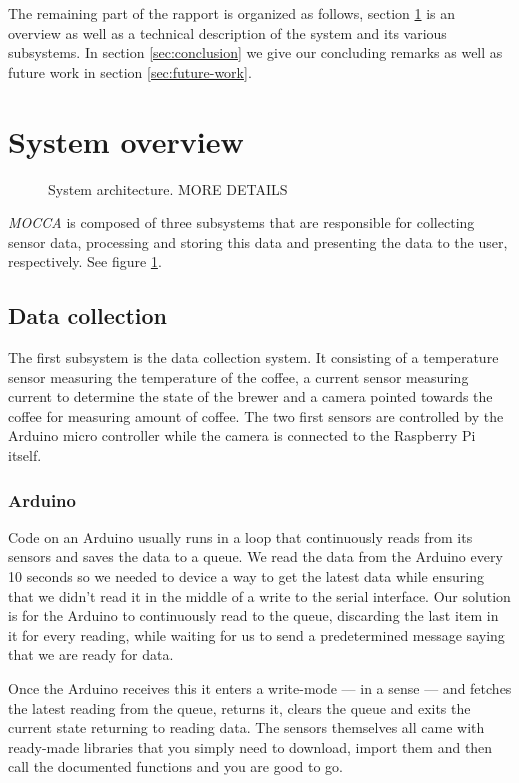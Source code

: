 \documentclass[12pt,a4paper,oneside,article]{memoir}
\numberwithin{equation}{chapter}
\begin{document}
The remaining part of the rapport is organized as follows, section 
\ref{sec:system-overview} is an overview as well as a technical
description of the system and its various subsystems. In section
\ref{sec:conclusion} we give our concluding remarks as well as future work in
section \ref{sec:future-work}.

\section{System overview}\label{sec:system-overview}
\begin{figure}[h]
  \centerfloat{}
  \scalebox{.75}{}
  \caption{System architecture. MORE DETAILS}\label{fig:architecture}
\end{figure}
\textit{MOCCA} is composed of three subsystems that are responsible for
collecting sensor data, processing and storing this data and presenting the data
to the user, respectively. See figure \ref{fig:architecture}.

\subsection{Data collection}\label{sec:data-collection}
The first subsystem is the data collection system. It consisting of a 
temperature sensor measuring the temperature of the coffee, a current sensor 
measuring current to determine the state of the brewer and a camera pointed 
towards the coffee for measuring amount of coffee. The two first sensors are 
controlled by the Arduino micro controller while the camera is 
connected to the Raspberry Pi itself.

\subsubsection{Arduino}\label{sec:arduino}
Code on an Arduino usually runs in a loop that continuously reads from 
its sensors and saves the data to a queue. We read the data from the 
Arduino every 10 seconds so we needed to device a way to get the latest data 
while ensuring that we didn't read it in the middle of a write to the serial 
interface. Our solution is for the Arduino to continuously read to the queue, 
discarding the last item in it for every reading, while waiting for us to send 
a predetermined message saying that we are ready for data.

Once the Arduino receives this it enters a write-mode --- in a sense --- and
fetches the latest reading from the queue, returns it, clears the queue and
exits the current state returning to reading data. The sensors themselves all
came with ready-made libraries that you simply need to download, import them and
then call the documented functions and you are good to go.
\end{document}
